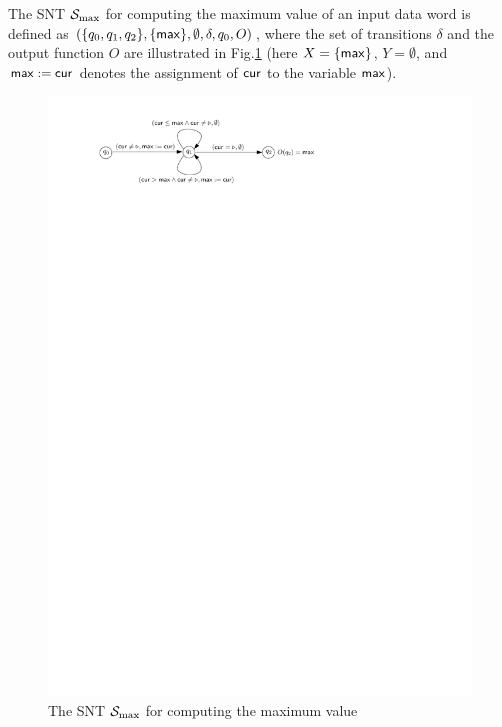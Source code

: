 \begin{example}
The SNT ${\mathcal{S} }_{\max}$ for computing the maximum value of an input data word is defined as $(\{q_0,q_1,q_2\}, \{\mathsf{max}\}, \emptyset, \delta, q_0, O)$, where the set of transitions $\delta$ and the output function $O$ are illustrated in Fig.\ref{fig-snt-exmp}
%
(here $X=\{\mathsf{max}\}$, $Y=\emptyset$, and $\mathsf{max}:=\mathsf{cur}$ denotes the assignment of $\mathsf{cur}$ to the variable $\mathsf{max}$).
\begin{figure}[htbp]
\begin{center}
\includegraphics{snt-exmp.pdf}
\caption{The SNT ${\mathcal{S} }_{\max}$ for computing the maximum value}
\label{fig-snt-exmp}
\end{center}
\end{figure}
\end{example}

